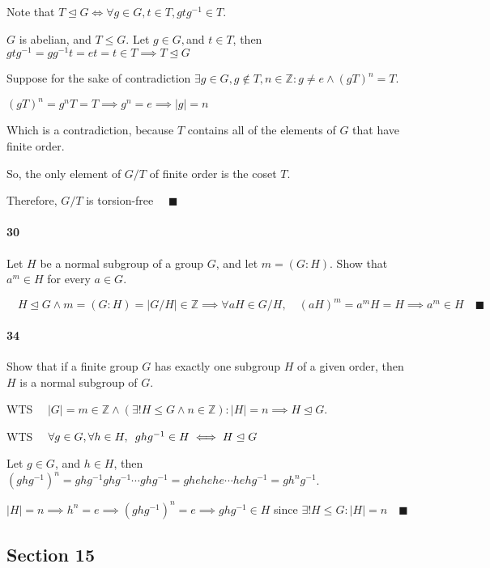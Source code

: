 \documentclass{article}
\newcommand\Z{\mathbb{Z}}
\begin{document}

Note that $T\trianglelefteq G \iff \forall g\in G,t \in T, gtg^{-1}
\in T.$

$G$ is abelian, and $T\leq G$. Let $g\in G,$and $t\in T$, then
$gtg^{-1} = gg^{-1}t = et = t\in T\implies T\trianglelefteq G$

Suppose for the sake of contradiction $\exists g \in G,g\not\in T,
n\in\Z: g\neq e \land (gT)^n = T$.

$ (gT)^n = g^n T = T \implies g^n = e \implies |g| = n$

Which is a contradiction, because $T$ contains all of the elements of
$G$ that have finite order.

So, the only element of $G/T$ of finite order is the coset $T$.

Therefore, $G/T$ is torsion-free $\quad \blacksquare$



\paragraph{30} Let $H$ be a normal subgroup of a group $G$, and let $m
= (G:H)$. Show that $a^m\in H$ for every $a\in G.$

 $\quad H\trianglelefteq G \land m = (G:H)=|G/H|\in \Z \implies \forall aH\in G/H,\quad (aH)^m = a^m H
= H \implies a^m \in H \quad \blacksquare$

\paragraph{34} Show that if a finite group $G$ has exactly one
subgroup $H$ of a given order, then $H$ is a normal subgroup of $G$.


WTS $\quad|G| = m \in \Z \land (\exists! H\leq G \land n\in\Z): |H| = n
\implies H\trianglelefteq G.$

WTS $\quad \forall g\in G, \forall h\in H,\enskip ghg^{-1} \in H \iff
H\trianglelefteq G$

Let $g\in G$, and $h\in H$, then $(ghg^{-1})^n =
ghg^{-1}ghg^{-1}\cdots ghg^{-1} = ghehehe\cdots hehg^{-1} = gh^ng^{-1}$.

$|H|=n \implies h^n = e \implies (ghg^{-1})^n = e \implies ghg^{-1} \in H$ since $\exists!
H\leq G: |H| = n\quad \blacksquare$

\subsection*{Section 15}
\end{document}
